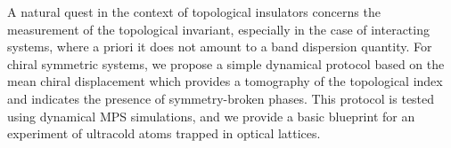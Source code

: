 A natural quest in the context of topological insulators concerns the measurement of the topological invariant, especially in the case of interacting systems, where a priori it does not amount to a band dispersion quantity.
For chiral symmetric systems, we propose a simple dynamical protocol based on the mean chiral displacement which provides a tomography of the topological index and indicates the presence of symmetry-broken phases.
This protocol is tested using dynamical MPS simulations, and we provide a basic blueprint for an experiment of ultracold atoms trapped in optical lattices.
